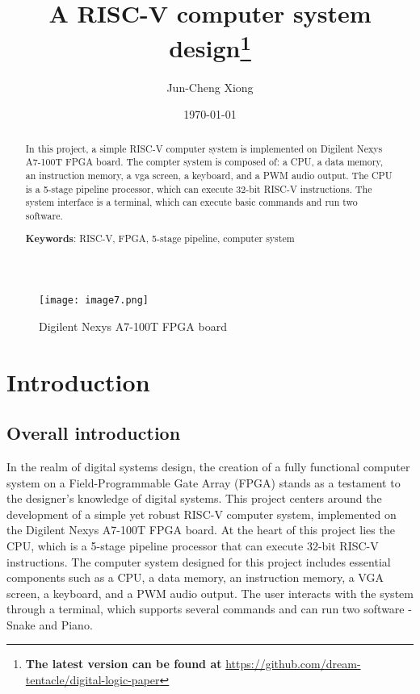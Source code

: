 \documentclass[
	a4paper, %
	11pt, %
]{CSUniSchoolLabReport}
\title{A RISC-V computer system design\thanks{\textbf{The latest version can be found at} \url{https://github.com/dream-tentacle/digital-logic-paper}}}
\author{Jun-Cheng Xiong} %
\date{\today} %
\begin{document}
\maketitle %


\begin{abstract}
    \large{
        In this project, a simple RISC-V computer system is implemented on Digilent Nexys A7-100T FPGA board. The compter system is composed of: a CPU, a data memory, an instruction memory, a vga screen, a keyboard, and a PWM audio output. The CPU is a 5-stage pipeline processor, which can execute 32-bit RISC-V instructions. The system interface is a terminal, which can execute basic commands and run two software.

        \textbf{Keywords}: RISC-V, FPGA, 5-stage pipeline, computer system
    }
\end{abstract}
\thispagestyle{empty}
\newpage

\thispagestyle{empty}
\tableofcontents
\quad
\begin{figure}[h]
    \centering
    \texttt{[image: image7.png]}
    \caption{Digilent Nexys A7-100T FPGA board}
    \label{fig:image7}
\end{figure}


\newpage
\setcounter{page}{1}
\section{Introduction}
\subsection{Overall introduction}

In the realm of digital systems design, the creation of a fully functional computer system on a Field-Programmable Gate Array (FPGA) stands as a testament to the designer's knowledge of digital systems. This project centers around the development of a simple yet robust RISC-V computer system, implemented on the Digilent Nexys A7-100T FPGA board. At the heart of this project lies the CPU, which is a 5-stage pipeline processor that can execute 32-bit RISC-V instructions. The computer system designed for this project includes essential components such as a CPU, a data memory, an instruction memory, a VGA screen, a keyboard, and a PWM audio output. The user interacts with the system through a terminal, which supports several commands and can run two software - Snake and Piano.
\end{document}
